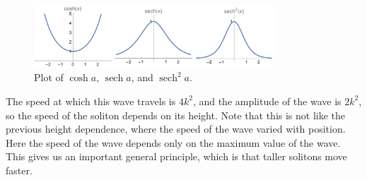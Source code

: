 \documentclass[fleqn]{NotesClass}
\DeclareMathOperator{\sech}{sech}
\begin{document}
    \begin{figure}
        \includegraphics[width=0.8\textwidth]{images/sech}
        \caption[\(\sech^2 a\)]{Plot of \(\cosh a\), \(\sech a\), and \(\sech^2 a\).}
        \label{fig:sech squared}
    \end{figure}
    
    The speed at which this wave travels is \(4k^2\), and the amplitude of the wave is \(2k^2\), so the speed of the soliton depends on its height.
    Note that this is not like the previous height dependence, where the speed of the wave varied with position.
    Here the speed of the wave depends only on the maximum value of the wave.
    This gives us an important general principle, which is that taller solitons move faster.
    
    
    
    \backmatter
    \renewcommand{\glossaryname}{Acronyms}
    \printglossary[acronym]
    \printindex
\end{document}
